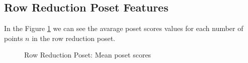 \documentclass{article}
\begin{document}
\subsection{Row Reduction Poset Features}
\par In the Figure \ref{fig:scores_poset_mean_rrp} we can see the avarage poset scores values for each number of points $n$ in the row reduction poset.
\begin{figure}[ht]
  \vspace{-96pt}
  \centering
  \hspace*{-0.19\textwidth}
  \caption{Row Reduction Poset: Mean poset scores}
  \label{fig:scores_poset_mean_rrp}
\end{figure}
\end{document}
